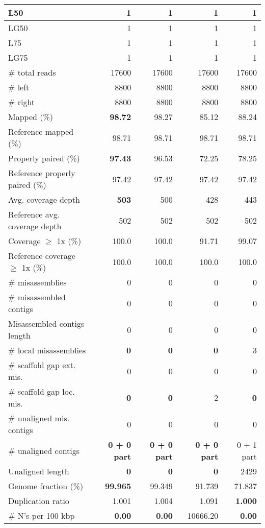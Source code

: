 \documentclass[12pt,a4paper]{article}
\begin{document}
\begin{table}[ht]
\begin{center}
\begin{tabular}{|l*{4}{|r}|}
L50 & 1 & 1 & 1 & 1 \\ \hline
LG50 & 1 & 1 & 1 & 1 \\ \hline
L75 & 1 & 1 & 1 & 1 \\ \hline
LG75 & 1 & 1 & 1 & 1 \\ \hline
\# total reads & 17600 & 17600 & 17600 & 17600 \\ \hline
\# left & 8800 & 8800 & 8800 & 8800 \\ \hline
\# right & 8800 & 8800 & 8800 & 8800 \\ \hline
Mapped (\%) & {\bf 98.72} & 98.27 & 85.12 & 88.24 \\ \hline
Reference mapped (\%) & 98.71 & 98.71 & 98.71 & 98.71 \\ \hline
Properly paired (\%) & {\bf 97.43} & 96.53 & 72.25 & 78.25 \\ \hline
Reference properly paired (\%) & 97.42 & 97.42 & 97.42 & 97.42 \\ \hline
Avg. coverage depth & {\bf 503} & 500 & 428 & 443 \\ \hline
Reference avg. coverage depth & 502 & 502 & 502 & 502 \\ \hline
Coverage $\geq$ 1x (\%) & 100.0 & 100.0 & 91.71 & 99.07 \\ \hline
Reference coverage $\geq$ 1x (\%) & 100.0 & 100.0 & 100.0 & 100.0 \\ \hline
\# misassemblies & 0 & 0 & 0 & 0 \\ \hline
\# misassembled contigs & 0 & 0 & 0 & 0 \\ \hline
Misassembled contigs length & 0 & 0 & 0 & 0 \\ \hline
\# local misassemblies & {\bf 0} & {\bf 0} & {\bf 0} & 3 \\ \hline
\# scaffold gap ext. mis. & 0 & 0 & 0 & 0 \\ \hline
\# scaffold gap loc. mis. & {\bf 0} & {\bf 0} & 2 & {\bf 0} \\ \hline
\# unaligned mis. contigs & 0 & 0 & 0 & 0 \\ \hline
\# unaligned contigs & {\bf 0 + 0 part} & {\bf 0 + 0 part} & {\bf 0 + 0 part} & 0 + 1 part \\ \hline
Unaligned length & {\bf 0} & {\bf 0} & {\bf 0} & 2429 \\ \hline
Genome fraction (\%) & {\bf 99.965} & 99.349 & 91.739 & 71.837 \\ \hline
Duplication ratio & 1.001 & 1.004 & 1.091 & {\bf 1.000} \\ \hline
\# N's per 100 kbp & {\bf 0.00} & {\bf 0.00} & 10666.20 & {\bf 0.00} \\ \hline

\end{tabular}
\end{center}
\end{table}
\end{document}
